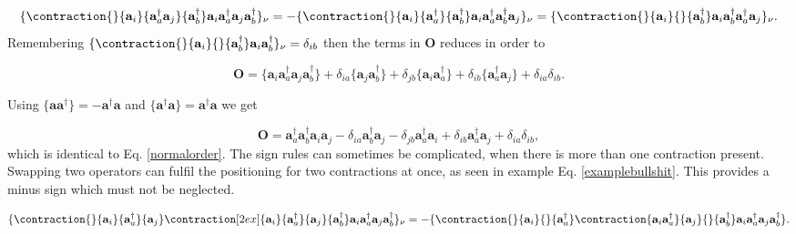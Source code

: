 \begin{equation}
\{
\contraction{}{\textbf{a}_i}{\textbf{a}^{\dag}_a \textbf{a}_j}{\textbf{a}^{\dag}_b}
\textbf{a}_i \textbf{a}^{\dag}_a \textbf{a}_j \textbf{a}^{\dag}_b
\}_{\nu}
= - \{
\contraction{}{\textbf{a}_i}{\textbf{a}^{\dag}_a}{\textbf{a}^{\dag}_b}
\textbf{a}_i \textbf{a}^{\dag}_a \textbf{a}^{\dag}_b 
\textbf{a}_j 
\}_{\nu}
= \{
\contraction{}{\textbf{a}_i}{}{\textbf{a}^{\dag}_b}
\textbf{a}_i  \textbf{a}^{\dag}_b 
\textbf{a}^{\dag}_a \textbf{a}_j 
\}_{\nu} . \label{wikssign}
\end{equation}
Remembering $\{\contraction{}{\textbf{a}_i}{}{\textbf{a}^{\dag}_b}
\textbf{a}_i  \textbf{a}^{\dag}_b \}_{\nu} = \delta_{ib}$ then the terms in $\textbf{O}$ reduces in order to

\begin{equation}
\textbf{O} =  \{ 
\textbf{a}_i \textbf{a}^{\dag}_a
\textbf{a}_j \textbf{a}^{\dag}_b
\} +
\delta_{ia} \{
\textbf{a}_j \textbf{a}^{\dag}_b
\} +
\delta_{jb} \{
\textbf{a}_i \textbf{a}^{\dag}_a
\} +
\delta_{ib} \{
\textbf{a}^{\dag}_a \textbf{a}_j
\} +
\delta_{ia} \delta_{ib} . 
\end{equation}

Using $\{
\textbf{a} \textbf{a}^{\dag}
\} = -\textbf{a}^{\dag} \textbf{a}$ and $\{
\textbf{a}^{\dag} \textbf{a} 
\} = \textbf{a}^{\dag} \textbf{a}$ we get

\begin{equation}
\textbf{O} = 
\textbf{a}^{\dag}_a \textbf{a}^{\dag}_b
\textbf{a}_i \textbf{a}_j  
- \delta_{ia} \textbf{a}^{\dag}_b \textbf{a}_j
- \delta_{jb} \textbf{a}^{\dag}_a \textbf{a}_i
+ \delta_{ib} \textbf{a}^{\dag}_a \textbf{a}_j 
+ \delta_{ia} \delta_{ib} ,
\end{equation}
which is identical to Eq. \eqref{normalorder}. The sign rules can sometimes be complicated, when there is more than one contraction present. Swapping two operators can fulfil the positioning for two contractions at once, as seen in example Eq. \eqref{examplebullshit}. This provides a minus sign which must not be neglected.

\begin{equation}
\{
\contraction{}{\textbf{a}_i}{\textbf{a}^{\dag}_a}{\textbf{a}_j}
\contraction[2ex]{\textbf{a}_i}{\textbf{a}^{\dag}_a}{\textbf{a}_j}{\textbf{a}^{\dag}_b}
\textbf{a}_i \textbf{a}^{\dag}_a \textbf{a}_j \textbf{a}^{\dag}_b
\}_{\nu}
= - \{
\contraction{}{\textbf{a}_i}{}{\textbf{a}^{\dag}_a}
\contraction{\textbf{a}_i \textbf{a}^{\dag}_a}{\textbf{a}_j}{}{\textbf{a}^{\dag}_b}
\textbf{a}_i \textbf{a}^{\dag}_a \textbf{a}_j \textbf{a}^{\dag}_b
\} . \label{examplebullshit}
\end{equation}

